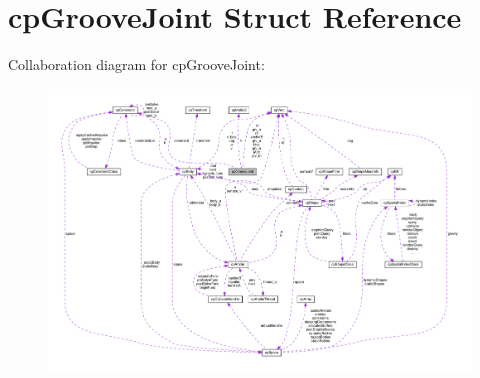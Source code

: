 \hypertarget{structcpGrooveJoint}{}\section{cp\+Groove\+Joint Struct Reference}
\label{structcpGrooveJoint}


Collaboration diagram for cp\+Groove\+Joint\+:
\nopagebreak
\begin{figure}[H]
\begin{center}
\leavevmode
\includegraphics[width=350pt]{structcpGrooveJoint__coll__graph}
\end{center}
\end{figure}
